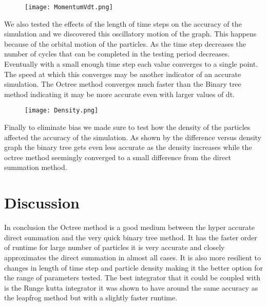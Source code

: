 \documentclass[11pt]{article}
\begin{document}
\begin{figure}[h]
\begin{center}
\texttt{[image: MomentumVdt.png]}
\end{center}
\caption{
}
\label{setup}
\end{figure}
\vspace{50mm}
We also tested the effects of the length of time steps on the accuracy of the simulation and we discovered this oscillatory motion of the graph. This happens because of the orbital motion of the particles. As the time step decreases the number of cycles that can be completed in the testing period decreases. Eventually with a small enough time step each value converges to a single point. The speed at which this converges may be another indicator of an accurate simulation. The Octree method converges much faster than the Binary tree method indicating it may be more accurate even with larger values of dt.

\begin{figure}[h]
\begin{center}
\texttt{[image: Density.png]}
\end{center}
\caption{
}
\label{setup}
\end{figure}
\vspace{90mm}
Finally to eliminate bias we made sure to test how the density of the particles affected the accuracy of the simulation. As shown by the difference versus density graph the binary tree gets even less accurate as the density increases while the octree method seemingly converged to a small difference from the direct summation method.
\section{Discussion}




In conclusion the Octree method is a good medium between the hyper accurate direct summation and the very quick binary tree method. It has the faster order of runtime for large number of particles it is very accurate and closely approximates the direct summation in almost all cases. It is also more resilient to changes in length of time step and particle density making it the better option for the range of parameters tested. The best integrator that it could be coupled with is the Runge kutta integrator it was shown to have around the same accuracy as the leapfrog method but with a slightly faster runtime. 
\end{document}
